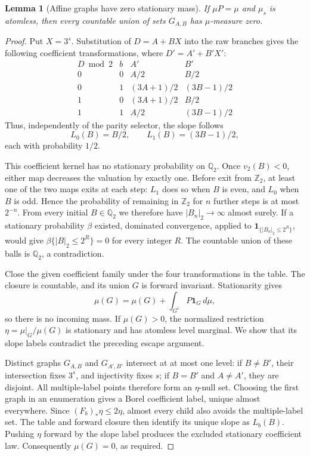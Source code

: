 \documentclass[11pt]{amsart}
\newtheorem{lemma}[theorem]{Lemma}
\theoremstyle{definition}
\theoremstyle{remark}
\newcommand{\Ztwo}{\mathbb Z_2}
\newcommand{\Qtwo}{\mathbb Q_2}
\newcommand{\one}{\mathbf 1}
\begin{document}
\begin{lemma}[Affine graphs have zero stationary mass]\label{st:affine}
If $\mu P=\mu$ and $\mu_s$ is atomless, then every countable union of
sets $G_{A,B}$ has $\mu$-measure zero.
\end{lemma}
\begin{proof}
Put $X=3^s$.  Substitution of $D=A+BX$ into the raw branches gives the
following coefficient transformations, where $D'=A'+B'X'$:
\[
\begin{array}{c|c|c|c}
 D\bmod2&b&A'&B'\\\hline
 0&0&A/2&B/2\\
 0&1&(3A+1)/2&(3B-1)/2\\
 1&0&(3A+1)/2&B/2\\
 1&1&A/2&(3B-1)/2
\end{array}
\]
Thus, independently of the parity selector, the slope follows
\begin{equation}
 L_0(B)=B/2,\qquad L_1(B)=(3B-1)/2,
 \label{st:slope-kernel}
\end{equation}
each with probability $1/2$.

This coefficient kernel has no stationary probability on $\Qtwo$.  Once
$v_2(B)<0$, either map decreases the valuation by exactly one.  Before
exit from $\Ztwo$, at least one of the two maps exits at each step:
$L_1$ does so when $B$ is even, and $L_0$ when $B$ is odd.  Hence the
probability of remaining in $\Ztwo$ for $n$ further steps is at most
$2^{-n}$.  From every initial $B\in\Qtwo$ we therefore have
$|B_n|_2\longrightarrow\infty$ almost surely.  If a stationary
probability $\beta$ existed, dominated convergence, applied to
$\one_{\{|B_n|_2\le2^R\}}$, would give
$\beta\{|B|_2\le2^R\}=0$ for every integer $R$.  The countable union of
these balls is $\Qtwo$, a contradiction.

Close the given coefficient family under the four transformations in the
table.  The closure is countable, and its union $G$ is forward invariant.
Stationarity gives
\[
 \mu(G)=\mu(G)+\int_{G^c}P\one_G\,d\mu,
\]
so there is no incoming mass.  If $\mu(G)>0$, the normalized restriction
$\eta=\mu|_G/\mu(G)$ is stationary and has atomless level marginal.
We show that its slope labels contradict the preceding escape argument.

Distinct graphs $G_{A,B}$ and $G_{A',B'}$ intersect at
at most one level: if $B\ne B'$, their intersection fixes $3^s$, and
injectivity fixes $s$; if $B=B'$ and $A\ne A'$, they are disjoint.
All multiple-label points therefore form an $\eta$-null set.  Choosing
the first graph in an enumeration gives a Borel coefficient label,
unique almost everywhere.  Since $(F_b)_*\eta\le2\eta$, almost every
child also avoids the multiple-label set.  The table and forward closure
then identify its unique slope as $L_b(B)$.  Pushing $\eta$ forward by
the slope label produces the excluded stationary coefficient law.
Consequently $\mu(G)=0$, as required.
\end{proof}
\end{document}
